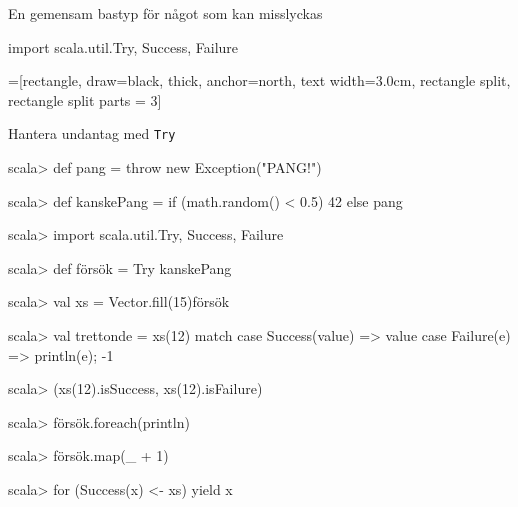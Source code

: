 \begin{Slide}{En gemensam bastyp för något som kan misslyckas}\SlideFontSmall
\begin{Code}
import scala.util.{Try, Success, Failure}
\end{Code}
\ifkompendium\footnotesize\fi
\vspace{-0.5em}\begin{center}
\newcommand{\TextBox}[1]{\raisebox{0pt}[1em][0.5em]{#1}}
=[rectangle, draw=black,  thick, anchor=north, text width=3.0cm, rectangle split, rectangle split parts = 3]
\end{center}
\end{Slide}

\begin{Slide}{Hantera undantag med \texttt{Try}}
\vspace{-0.5em}\begin{REPL}
scala> def pang = throw new Exception("PANG!")

scala> def kanskePang = if (math.random() < 0.5) 42 else pang

scala> import scala.util.{Try, Success, Failure}

scala> def försök = Try { kanskePang }

scala> val xs = Vector.fill(15){försök}

scala> val trettonde = xs(12) match {
         case Success(value) => value
         case Failure(e) => println(e); -1
       }

scala> (xs(12).isSuccess, xs(12).isFailure)

scala> försök.foreach(println)

scala> försök.map(_ + 1)

scala> for (Success(x) <- xs) yield x
\end{REPL}
\end{Slide}

